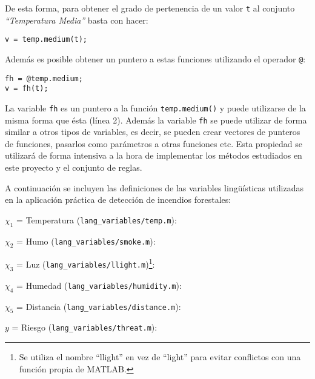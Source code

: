 De esta forma, para obtener el grado de pertenencia de un valor \lstinline|t| al conjunto \emph{``Temperatura Media''} basta con hacer:

\begin{lstlisting}
v = temp.medium(t);
\end{lstlisting}

Además es posible obtener un puntero a estas funciones utilizando el operador \lstinline|@|:

\begin{lstlisting}
fh = @temp.medium;
v = fh(t);
\end{lstlisting}

La variable \lstinline|fh| es un puntero a la función \lstinline|temp.medium()| y puede utilizarse de la misma forma que ésta (línea 2). Además la variable \lstinline|fh| se puede utilizar de forma similar a otros tipos de variables, es decir, se pueden crear vectores de punteros de funciones, pasarlos como parámetros a otras funciones etc. Esta propiedad se utilizará de forma intensiva a la hora de implementar los métodos estudiados en este proyecto y el conjunto de reglas.

A continuación se incluyen las definiciones de las variables lingüísticas utilizadas en la aplicación práctica de detección de incendios forestales:

$\chi_1$ = Temperatura (\lstinline|lang_variables/temp.m|):


$\chi_2$ = Humo (\lstinline|lang_variables/smoke.m|):


$\chi_3$ = Luz (\lstinline|lang_variables/llight.m|)\footnote{Se utiliza el nombre ``llight'' en vez de ``light'' para evitar conflictos con una función propia de MATLAB.}:


$\chi_4$ = Humedad (\lstinline|lang_variables/humidity.m|):


$\chi_5$ = Distancia (\lstinline|lang_variables/distance.m|):


$y$ = Riesgo (\lstinline|lang_variables/threat.m|):
